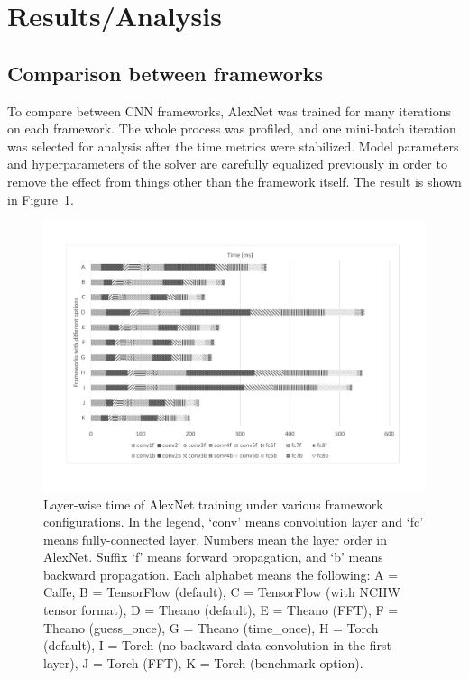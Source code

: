 \section{Results/Analysis}

\subsection{Comparison between frameworks}
To compare between CNN frameworks, AlexNet was trained for many iterations on each framework.
The whole process was profiled, and one mini-batch iteration was selected for analysis after the time metrics were stabilized.
Model parameters and hyperparameters of the solver are carefully equalized previously in order to remove the effect from things other than the framework itself.
The result is shown in Figure~\ref{fig_time_frameworks}.

\begin{figure}
  \centering
  \includegraphics[width=\linewidth]{./figures/time_frameworks}
  \caption{
Layer-wise time of AlexNet training under various framework configurations.
In the legend, `conv' means convolution layer and `fc' means fully-connected layer.
Numbers mean the layer order in AlexNet.
Suffix `f' means forward propagation, and `b' means backward propagation.
Each alphabet means the following: A = Caffe, B = TensorFlow (default), C = TensorFlow (with NCHW tensor format), D = Theano (default), E = Theano (FFT), F = Theano (guess\_once), G = Theano (time\_once), H = Torch (default), I = Torch (no backward data convolution in the first layer), J = Torch (FFT), K = Torch (benchmark option).
}
  \label{fig_time_frameworks}
\end{figure}

